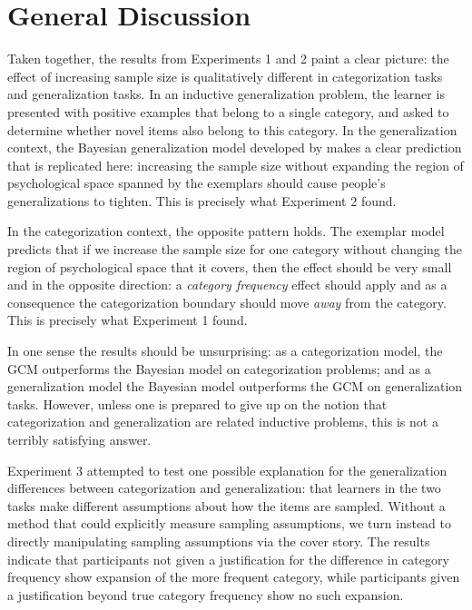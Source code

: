 \documentclass[doc,apacite]{apa6}
\begin{document}




\section{General Discussion}

Taken together, the results from Experiments 1 and 2 paint a clear picture: the effect of increasing sample size is qualitatively different in categorization tasks and generalization tasks. In an inductive generalization problem, the learner is presented with positive examples that belong to a single category, and asked to determine whether novel items also belong to this category. In the generalization context, the Bayesian generalization model developed by  makes a clear prediction that is replicated here:  increasing the sample size without expanding the region of psychological space spanned by the exemplars should cause people's generalizations to tighten. This is precisely what Experiment 2 found. 

In the categorization context, the opposite pattern holds. The exemplar model predicts that if we increase the sample size for one category without changing the region of psychological space that it covers, then the effect should be very small and in the opposite direction: a {\it category frequency} effect should apply and as a consequence the categorization boundary should move {\it away} from the category. This is precisely what Experiment 1 found.

In one sense the results should be unsurprising: as a categorization model, the GCM outperforms the Bayesian model on categorization problems; and as a generalization model the Bayesian model outperforms the GCM on generalization tasks. However, unless one is prepared to give up on the notion that categorization and generalization are related inductive problems, this is not a terribly satisfying answer.

Experiment 3 attempted to test one possible explanation for the generalization differences between categorization and generalization: that learners in the two tasks make different assumptions about how the items are sampled. Without a method that could explicitly measure sampling assumptions, we turn instead to directly manipulating sampling assumptions via the cover story. The results indicate that participants not given a justification for the difference in category frequency show expansion of the more frequent category, while participants given a justification beyond true category frequency show no such expansion.
\end{document}
